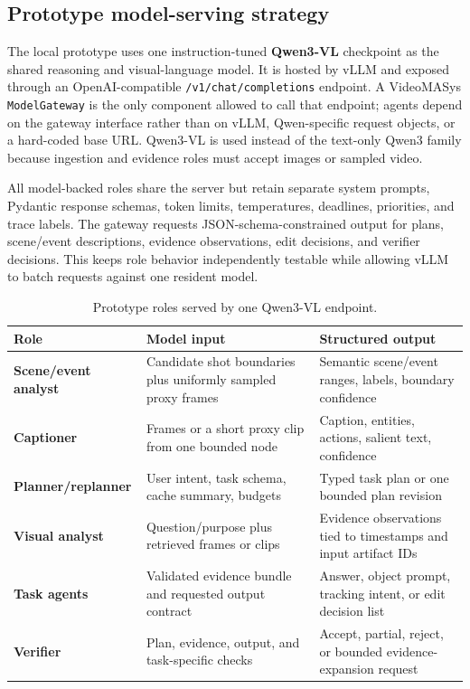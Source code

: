 \documentclass[11pt]{article}
\newcommand{\term}[1]{\textbf{#1}}
\newcommand{\code}[1]{\texttt{#1}}
\begin{document}
\subsection{Prototype model-serving strategy}

The local prototype uses one instruction-tuned \term{Qwen3-VL} checkpoint as
the shared reasoning and visual-language model. It is hosted by vLLM and exposed
through an OpenAI-compatible \code{/v1/chat/completions} endpoint. A VideoMASys
\code{ModelGateway} is the only component allowed to call that endpoint; agents
depend on the gateway interface rather than on vLLM, Qwen-specific request
objects, or a hard-coded base URL. Qwen3-VL is used instead of the text-only
Qwen3 family because ingestion and evidence roles must accept images or sampled
video.

All model-backed roles share the server but retain separate system prompts,
Pydantic response schemas, token limits, temperatures, deadlines, priorities,
and trace labels. The gateway requests JSON-schema-constrained output for plans,
scene/event descriptions, evidence observations, edit decisions, and verifier
decisions. This keeps role behavior independently testable while allowing vLLM
to batch requests against one resident model.

\begin{table}[H]
\centering
\small
\begin{tabularx}{\textwidth}{>{\bfseries}p{34mm} p{48mm} X}
\toprule
Role & Model input & Structured output \\
\midrule
Scene/event analyst & Candidate shot boundaries plus uniformly sampled proxy
frames & Semantic scene/event ranges, labels, boundary confidence \\
Captioner & Frames or a short proxy clip from one bounded node & Caption,
entities, actions, salient text, confidence \\
Planner/replanner & User intent, task schema, cache summary, budgets & Typed task
plan or one bounded plan revision \\
Visual analyst & Question/purpose plus retrieved frames or clips & Evidence
observations tied to timestamps and input artifact IDs \\
Task agents & Validated evidence bundle and requested output contract & Answer,
object prompt, tracking intent, or edit decision list \\
Verifier & Plan, evidence, output, and task-specific checks & Accept, partial,
reject, or bounded evidence-expansion request \\
\bottomrule
\end{tabularx}
\caption{Prototype roles served by one Qwen3-VL endpoint.}
\end{table}
\end{document}
